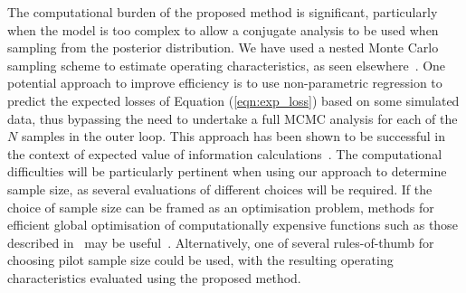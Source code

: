 \documentclass[AMA,STIX1COL]{WileyNJD-v2}
\begin{document}
The computational burden of the proposed method is significant, particularly when the model is too complex to allow a conjugate analysis to be used when sampling from the posterior distribution. We have used a nested Monte Carlo sampling scheme to estimate operating characteristics, as seen elsewhere~\cite{Wang2002, OHagan2005, Sutton2007}. One potential approach to improve efficiency is to use non-parametric regression to predict the expected losses of Equation (\ref{eqn:exp_loss}) based on some simulated data, thus bypassing the need to undertake a full MCMC analysis for each of the $N$ samples in the outer loop. This approach has been shown to be successful in the context of expected value of information calculations~\cite{Strong2014, Strong2015}. The computational difficulties will be particularly pertinent when using our approach to determine sample size, as several evaluations of different choices will be required. If the choice of sample size can be framed as an optimisation problem, methods for efficient global optimisation of computationally expensive functions such as those described in~\cite{Jones2001, Roustant2012} may be useful~\cite{Wilson2015}. Alternatively, one of several rules-of-thumb for choosing pilot sample size \cite{Lancaster2004, Julious2005, Teare2014, Whitehead2015} could be used, with the resulting operating characteristics evaluated using the proposed method.

\end{document}
